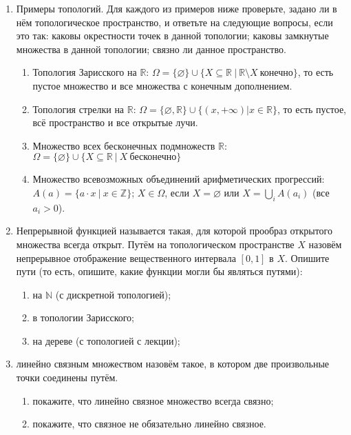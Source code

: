 \documentclass[10pt,a4paper,oneside]{article}
\begin{document}
\begin{enumerate}
\item Примеры топологий.
Для каждого из примеров ниже проверьте, задано ли в нём топологическое пространство, и ответьте на следующие вопросы, если это так:
каковы окрестности точек в данной топологии;
каковы замкнутые множества в данной топологии;
связно ли данное пространство.

\begin{enumerate}
\item Топология Зарисского на $\mathbb{R}$: 
$\Omega = \{\varnothing\} \cup \{ X \subseteq \mathbb{R}\ |\ \mathbb{R} \setminus X\ \text{конечно} \}$,
то есть пустое множество и все множества с конечным дополнением.
\item Топология стрелки на $\mathbb{R}$:
$\Omega = \{\varnothing, \mathbb{R}\} \cup \{ (x,+\infty) | x \in \mathbb{R} \}$, то есть пустое, 
всё пространство и все открытые лучи.
\item Множество всех бесконечных подмножеств $\mathbb{R}$:
$\Omega = \{\varnothing\} \cup \{ X \subseteq \mathbb{R}\ |\ X\ \text{бесконечно} \}$
\item Множество всевозможных объединений арифметических прогрессий:
$A(a) = \{ a\cdot x\ |\ x \in \mathbb{Z}\}$;
$X \in \Omega$, если $X=\varnothing$ или $X = \bigcup_i A(a_i)$ (все $a_i > 0$).
\end{enumerate}

\item Непрерывной функцией называется такая, для которой прообраз открытого множества всегда открыт.
Путём на топологическом пространстве $X$ назовём непрерывное отображение вещественного интервала $[0,1]$ в $X$.
Опишите пути (то есть, опишите, какие функции могли бы являться путями):
\begin{enumerate}
\item на $\mathbb{N}$ (с дискретной топологией);
\item в топологии Зарисского;
\item на дереве (с топологией с лекции);
\end{enumerate}

\item линейно связным множеством назовём такое, в котором две произвольные точки соединены путём. 
\begin{enumerate}
\item покажите, что линейно связное множество всегда связно;
\item покажите, что связное не обязательно линейно связное.
\end{enumerate}


\end{enumerate}
\end{document}
